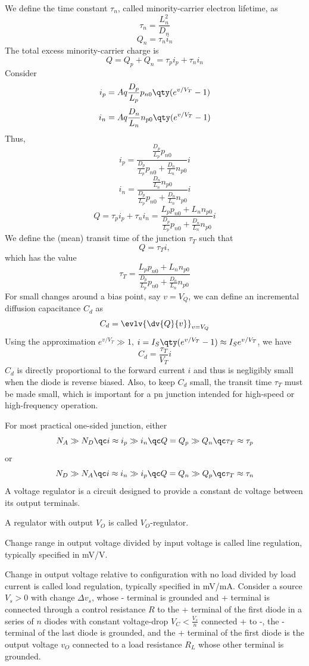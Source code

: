 \documentclass[a4paper,12pt]{report}
\begin{document}
We define the time constant $\tau_n$, called minority-carrier electron lifetime, as
\[\tau_n=\frac{L_n^2}{D_n}\]
\[Q_n=\tau_ni_n\]
\eit
The total excess minority-carrier charge is
\[Q=Q_p+Q_n=\tau_pi_p+\tau_ni_n\]
Consider
\[i_p=Aq\frac{D_p}{L_p}p_{n0}\qty(e^{v/V_T}-1)\]
\[i_n=Aq\frac{D_n}{L_n}n_{p0}\qty(e^{v/V_T}-1)\]
Thus,
\[i_p=\frac{\frac{D_p}{L_p}p_{n0}}{\frac{D_p}{L_p}p_{n0}+\frac{D_n}{L_n}n_{p0}}i\]
\[i_n=\frac{\frac{D_n}{L_n}n_{p0}}{\frac{D_p}{L_p}p_{n0}+\frac{D_n}{L_n}n_{p0}}i\]
\[Q=\tau_pi_p+\tau_ni_n=\frac{L_pp_{n0}+L_nn_{p0}}{\frac{D_p}{L_p}p_{n0}+\frac{D_n}{L_n}n_{p0}}i\]
We define the (mean) transit time of the junction $\tau_T$ such that
\[Q=\tau_Ti,\]
which has the value
\[\tau_T=\frac{L_pp_{n0}+L_nn_{p0}}{\frac{D_p}{L_p}p_{n0}+\frac{D_n}{L_n}n_{p0}}\]
For small changes around a bias point, say $v=V_Q$, we can define an incremental diffusion capacitance $C_d$ as
\[C_d=\evlv{\dv{Q}{v}}_{v=V_Q}\]
Using the approximation $e^{v/V_T}\gg 1$, $i=I_S\qty(e^{v/V_T}-1)\approx I_Se^{v/V_T}$, we have
\[C_d=\frac{\tau_T}{V_T}i\]
$C_d$ is directly proportional to the forward current $i$ and thus is negligibly small when the diode is reverse biased. Also, to keep $C_d$ small, the transit time $\tau_T$ must be made small, which is important for a pn junction intended for high-speed or high-frequency operation.

For most practical one-sided junction, either
\[N_A\gg N_D\qc i\approx i_p\gg i_n\qc Q=Q_p\gg Q_n\qc\tau_T\approx\tau_p\]
or
\[N_D\gg N_A\qc i\approx i_n\gg i_p\qc Q=Q_n\gg Q_p\qc\tau_T\approx\tau_n\]
A voltage regulator is a circuit designed to provide a constant dc voltage between its output terminals.
\bit
\item A regulator with output $V_O$ is called $V_O$-regulator.
\item Change range in output voltage divided by input voltage is called line regulation, typically specified in mV/V.
\item Change in output voltage relative to configuration with no load divided by load current is called load regulation, typically specified in mV/mA.
\eit
{}
Consider a source $V_s>0$ with change $\Delta v_s$, whose - terminal is grounded and + terminal is connected through a control resistance $R$ to the + terminal of the first diode in a series of $n$ diodes with constant voltage-drop $V_C<\frac{V_s}{n}$ connected + to -, the - terminal of the last diode is grounded, and the + terminal of the first diode is the output voltage $v_O$ connected to a load resistance $R_L$ whose other terminal is grounded.
\end{document}
